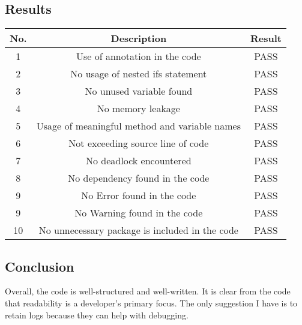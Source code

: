 \documentclass[a4paper,12pt]{article}
\begin{document}
    \subsection{Results}
    \begin{center}
    \begin{tabular}{||c c c||} 
     \hline
     No. & Description & Result \\ 
     \hline\hline
     1 & Use of annotation in the code  & PASS \\ 
     \hline
     2 & No usage of nested ifs statement & PASS \\
     \hline
     3 & No unused variable found & PASS \\
     \hline
     4 & No memory leakage & PASS \\
     \hline
     
     \hline
     5 & Usage of meaningful method and variable names & PASS \\
     \hline
     
     \hline
     6 & Not exceeding source line of  code & PASS \\
     \hline
     7 & No deadlock encountered & PASS \\
     \hline
     8 & No dependency found in the code & PASS \\
     \hline
     9 & No Error found in the code & PASS \\
     \hline
     9 & No Warning found in the code & PASS \\
     \hline
     10 & No unnecessary package is included in the code  & PASS \\
     \hline
    \end{tabular}
    \end{center}
    
    \subsection{Conclusion}
    Overall, the code is well-structured and well-written. It is clear from the code that readability is a developer's primary focus. The only suggestion I have is to retain logs because they can help with debugging.
\end{document}
